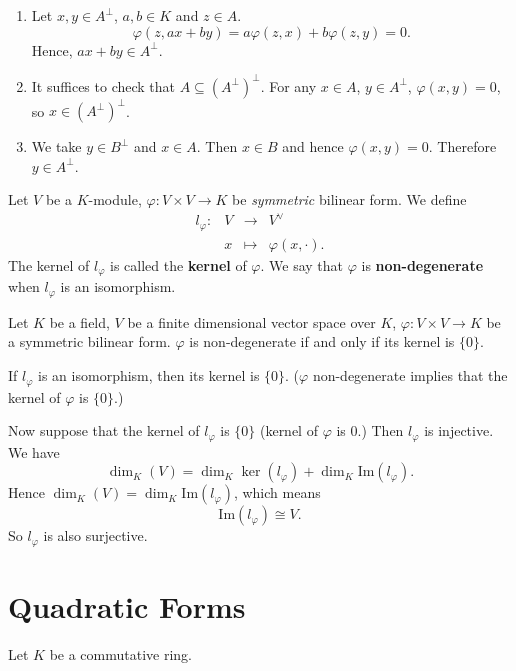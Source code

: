 \begin{proofenv}
    \quad
    \begin{enumerate}
        \item Let $x,y\in A^\perp$, $a,b\in K$ and $z\in A$.
        $$ \varphi\left(z, ax+by\right) = a \varphi \left(z,x\right) + b \varphi \left(z,y\right) = 0.$$
        Hence, $ax+by\in A^\perp$.
        \item It suffices to check that $A\subseteq \left(A^\perp\right)^\perp$. For any $x\in A$, $y\in A^\perp$, $\varphi(x,y) = 0$, so $x\in \left(A^\perp\right)^\perp$.
        \item We take $y \in B^\perp$ and $x\in A$. Then $x\in B$ and hence $\varphi(x,y)=0$. Therefore $y\in A^\perp$.
    \end{enumerate}
\end{proofenv}

\begin{definitionenv}
    Let $V$ be a $K$-module, $\varphi:V\times V\rightarrow K$ be \textit{symmetric} bilinear form.
    We define
    $$
    \begin{array}{rrcl}
        l_\varphi : & V& \rightarrow & V^\vee\\
        & x &\mapsto & \varphi(x,\cdot).
    \end{array}
    $$
    The kernel of $l_\varphi$ is called the \textbf{kernel} of $\varphi$.
    We say that $\varphi$ is \textbf{non-degenerate} when $l_\varphi$ is an isomorphism.
\end{definitionenv}
\begin{theoremenv}
    Let $K$ be a field, $V$ be a finite dimensional vector space over $K$, $\varphi : V\times V\rightarrow K$ be a symmetric bilinear form.
    $\varphi$ is non-degenerate if and only if its kernel is $\{0\}$.
\end{theoremenv}
\begin{proofenv}
    If $l_\varphi$ is an isomorphism, then its kernel is $\{0\}$. ($\varphi$ non-degenerate implies that the kernel of $\varphi$ is $\{0\}$.)

    \quad Now suppose that the kernel of $l_\varphi$ is $\{0\}$ (kernel of $\varphi$ is $0$.) Then $l_\varphi$ is injective. We have 
    $$ \dim_{K}(V) = \dim_{K} \ker(l_\varphi) + \dim_{K} \mathrm{Im}(l_\varphi).$$
    Hence $\dim_{K}(V) = \dim_{K} \mathrm{Im}(l_\varphi)$, which means
    $$ \mathrm{Im}(l_\varphi) \cong  V.$$
    So $l_\varphi$ is also surjective.
\end{proofenv}

\section{Quadratic Forms}
\quad Let $K$ be a commutative ring.

